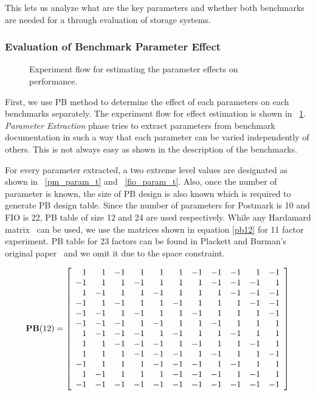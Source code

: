  This lets us analyze what are the key parameters and whether both benchmarks are needed for a through evaluation of storage systems.

\subsubsection{Evaluation of Benchmark Parameter Effect}

\begin{figure}[!t]
\centering

\captionsetup{format=myformat}
\caption{Experiment flow for estimating the parameter effects on performance.}
\label{pb_flow_t}
\end{figure}

First, we use PB method to determine the effect of each parameters on each benchmarks separately. 
The experiment flow for effect estimation is shown in \figurename~\ref{pb_flow_t}. 
\emph{Parameter Extraction} phase tries to extract parameters from benchmark documentation in such a way that each parameter can be varied independently of others. 
This is not always easy as shown in the description of the benchmarks. 

For every parameter extracted, a two extreme level values are designated as shown in \tablename~\ref{pm_param_t} and \tablename~\ref{fio_param_t}. 
Also, once the number of parameter is known, the size of PB design is also known which is required to generate PB design table.  
Since the number of parameters for Postmark is 10 and FIO is 22, PB table of size 12 and 24 are used respectively. 
While any Hardamard matrix~\cite{hadamar:1954} can be used, we use the matrices shown in equation \ref {pb12} for 11 factor experiment.  
PB table for 23 factors can be found in Plackett and Burman's original paper~\cite{plackett:1946} and we omit it due to the space constraint. 

\begin{equation}\label{pb12}
\mathbf{PB}(12)=
\left [ {\begin{array}{r r r r r r r r r r r}
  1&  1& -1&  1&  1&  1& -1& -1& -1&  1& -1\\
 -1&  1&  1& -1&  1&  1&  1& -1& -1& -1&  1\\
  1& -1&  1&  1& -1&  1&  1&  1& -1& -1& -1\\
 -1&  1& -1&  1&  1& -1&  1&  1&  1& -1& -1\\
 -1& -1&  1& -1&  1&  1& -1&  1&  1&  1& -1\\
 -1& -1& -1&  1& -1&  1&  1& -1&  1&  1&  1\\
  1& -1& -1& -1&  1& -1&  1&  1& -1&  1&  1\\
  1&  1& -1& -1& -1&  1& -1&  1&  1& -1&  1\\
  1&  1&  1& -1& -1& -1&  1& -1&  1&  1& -1\\
 -1&  1&  1&  1& -1& -1& -1&  1& -1&  1&  1\\
  1& -1&  1&  1&  1& -1& -1& -1&  1& -1&  1\\
 -1& -1& -1& -1& -1& -1& -1& -1& -1& -1& -1\\
\end{array}} \right ] 
\end{equation}

